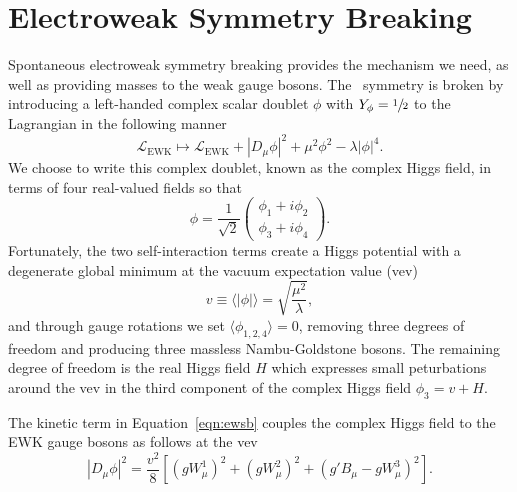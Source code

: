 \section{Electroweak Symmetry Breaking}
\label{sec:ewsb}

Spontaneous electroweak symmetry breaking provides the mechanism we need, as well as providing masses to the weak gauge bosons. The \sutwo\ symmetry is broken by introducing a left-handed complex scalar doublet $\phi$ with $Y_\phi = \sfrac{1}{2}$ to the Lagrangian in the following manner
\begin{equation}
  \label{eqn:ewsb}
  \mathcal{L}_{\text{EWK}} \mapsto \mathcal{L}_{\text{EWK}} + \left|D_\mu \phi \right|^2 + \mu^2 \phi^2 - \lambda \left| \phi \right|^4 .
\end{equation}
We choose to write this complex doublet, known as the complex Higgs field, in terms of four real-valued fields so that
\begin{equation}
  \phi = \frac{1}{\sqrt{2}} \begin{pmatrix} \phi_1 + i \phi_2 \\ \phi_3 + i\phi_4 \end{pmatrix} .
\end{equation}
Fortunately, the two self-interaction terms create a Higgs potential with a degenerate global minimum at the vacuum expectation value (vev)
\begin{equation}
  v \equiv \langle | \phi | \rangle = \sqrt{ \frac{\mu^2}{\lambda}},
\end{equation}
and through gauge rotations we set $\langle \phi_{1,2,4} \rangle = 0$, removing three degrees of freedom and producing three massless Nambu-Goldstone bosons.
The remaining degree of freedom is the real Higgs field $H$ which expresses small peturbations around the vev in the third component of the complex Higgs field $\phi_3 = v + H$.

The kinetic term in Equation~\ref{eqn:ewsb} couples the complex Higgs field to the EWK gauge bosons as follows at the vev
\begin{equation}
  \left| D_\mu \phi \right|^2 = \frac{v^2}{8} \left[ \left(g W_\mu^1 \right)^2 + \left(g W_\mu^2 \right)^2 + \left(g' B_\mu - g W_\mu^3 \right)^2 \right].
\end{equation}

